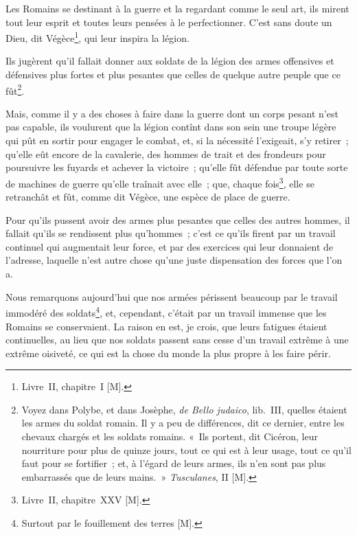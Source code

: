 \documentclass[french,twoside]{book} %
\newcommand\chaptercont{} %
\begin{document}
\chaptercont
\noindent Les Romains se destinant à la guerre et la regardant comme le seul art, ils mirent tout leur esprit et toutes leurs pensées à le perfectionner. C’est sans doute un Dieu, dit Végèce\footnote{Livre II, chapitre I [M].}, qui leur inspira la légion.\par
Ils jugèrent qu’il fallait donner aux soldats de la légion des armes offensives et défensives plus fortes et plus pesantes que celles de quelque autre peuple que ce fût\footnote{Voyez dans Polybe, et dans Josèphe, {\itshape de Bello judaico}, lib. III, quelles étaient les armes du soldat romain. Il y a peu de différences, dit ce dernier, entre les chevaux chargés et les soldats romains. « Ils portent, dit Cicéron, leur nourriture pour plus de quinze jours, tout ce qui est à leur usage, tout ce qu’il faut pour se fortifier ; et, à l’égard de leurs armes, ils n’en sont pas plus embarrassés que de leurs mains. » {\itshape Tusculanes}, II [M].}.\par
Mais, comme il y a des choses à faire dans la guerre dont un corps pesant n’est pas capable, ils voulurent que la légion contînt dans son sein une troupe légère qui pût en sortir pour engager le combat, et, si la nécessité l’exigeait, s’y retirer ; qu’elle eût encore de la cavalerie, des hommes de trait et des frondeurs pour poursuivre les fuyards et achever la victoire ; qu’elle fût défendue par toute sorte de machines de guerre qu’elle traînait avec elle ; que, chaque fois\footnote{Livre II, chapitre XXV [M].}, elle se retranchât et fût, comme dit Végèce, une espèce de place de guerre.\par
Pour qu’ils pussent avoir des armes plus pesantes que celles des autres hommes, il fallait qu’ils se rendissent plus qu’hommes ; c’est ce qu’ils firent par un travail continuel qui augmentait leur force, et par des exercices qui leur donnaient de l’adresse, laquelle n’est autre chose qu’une juste dispensation des forces que l’on a.\par
Nous remarquons aujourd’hui que nos armées périssent beaucoup par le travail immodéré des soldats\footnote{Surtout par le fouillement des terres [M].}, et, cependant, c’était par un travail immense que les Romains se conservaient. La raison en est, je crois, que leurs fatigues étaient continuelles, au lieu que nos soldats passent sans cesse d’un travail extrême à une extrême oisiveté, ce qui est la chose du monde la plus propre à les faire périr.\par
\end{document}
